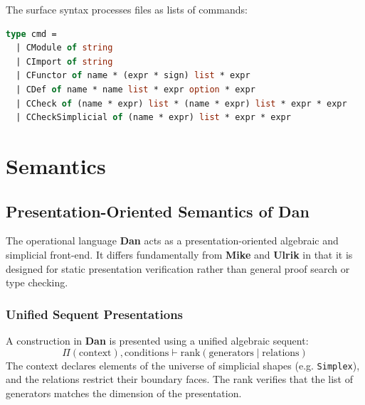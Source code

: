 \documentclass[11pt]{article}
\newcommand{\dan}[0]{\textbf{Dan}}
\newcommand{\mike}[0]{\textbf{Mike}}
\newcommand{\ulrik}[0]{\textbf{Ulrik}}
\begin{document}
The surface syntax processes files as lists of commands:
\begin{lstlisting}[language=ml]
type cmd =
  | CModule of string
  | CImport of string
  | CFunctor of name * (expr * sign) list * expr
  | CDef of name * name list * expr option * expr
  | CCheck of (name * expr) list * (name * expr) list * expr * expr
  | CCheckSimplicial of (name * expr) list * expr * expr
\end{lstlisting}

\newpage
\section{Semantics}

\subsection{Presentation-Oriented Semantics of Dan}

The operational language \dan{} acts as a presentation-oriented algebraic and simplicial front-end. It differs fundamentally from \mike{} and \ulrik{} in that it is designed for static presentation verification rather than general proof search or type checking.

\subsubsection{Unified Sequent Presentations}
A construction in \dan{} is presented using a unified algebraic sequent:
\begin{equation}
    \Pi(\text{context}), \text{conditions} \vdash \text{rank} (\text{generators} \mid \text{relations})
\end{equation}
The context declares elements of the universe of simplicial shapes (e.g. \texttt{Simplex}), and the relations restrict their boundary faces. The rank verifies that the list of generators matches the dimension of the presentation.
\end{document}
